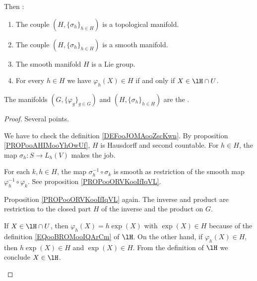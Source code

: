 \begin{propositionDef}
\begin{enumerate}
\begin{equation}
		      \end{equation}
	\end{enumerate}
	Then :
	\begin{enumerate}
		\item		\label{ITEMooLNBGooFoqGxF}
		      The couple \( (H,\{ \sigma_h \}_{h\in H})\) is a topological manifold.
		\item		\label{ITEMooZRGGooDeLHeg}
		      The couple \( (H,\{ \sigma_h \}_{h\in H})\) is a smooth manifold.
		\item	\label{ITEMooEZRLooHEsGkB}
		      The smooth manifold \( H\) is a Lie group.
		\item	\label{ITEMooUYJSooNjfsLQ}
		      For every \( h\in H\) we have \( \varphi_h(X)\in H\) if and only if \( X\in \lH\cap U\).
	\end{enumerate}

	The manifolds \( (G,\{ \varphi_g \}_{g\in G})\) and \( (H,\{ \sigma_h \}_{h\in H})\) are the .
\end{propositionDef}

\begin{proof}
	Several points.
	\begin{subproof}
		We have to check the definition \ref{DEFooJOMAooZscKwn}. By proposition \ref{PROPooAHIMooYhOwUf}, \( H\) is Hausdorff and second countable. For \( h\in H\), the map \(\sigma_h \colon S\to L_h(V)  \) makes the job.

		For each \( k,h\in H\), the map \( \sigma_h^{-1}\circ \sigma_k\) is smooth as restriction of the smooth map \( \varphi_h^{-1}\circ\varphi_k\). See proposition \ref{PROPooORVKooIfIqVL}.

		Proposition \ref{PROPooORVKooIfIqVL} again. The inverse and product are restriction to the closed part \( H\) of the inverse and the product on \( G\).

		If \( X\in \lH\cap U\), then \( \varphi_h(X)=h\exp(X)\) with \( \exp(X)\in H\) because of the definition \eqref{EQooBROMooIQArCm} of \( \lH\). On the other hand, if \( \varphi_h(X)\in H\), then \( h\exp(X)\in H\) and \( \exp(X)\in H\). From the definition of \( \lH\) we conclude \( X\in \lH\).
	\end{subproof}
\end{proof}

